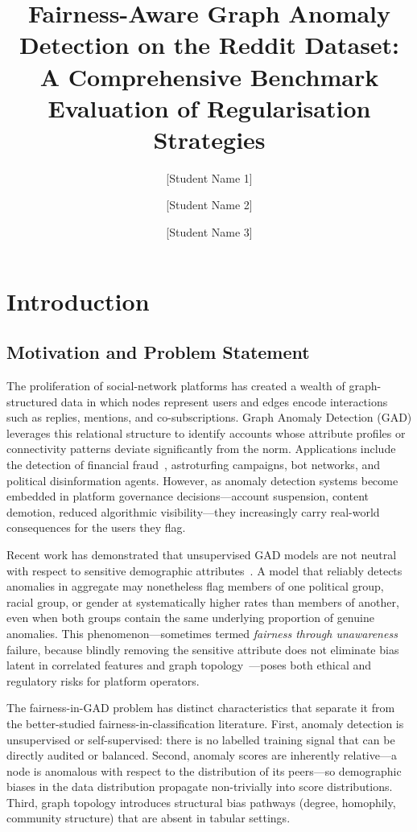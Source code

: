 \documentclass[sigconf,natbib=false]{acmart}
\title{Fairness-Aware Graph Anomaly Detection on the Reddit Dataset:\\
A Comprehensive Benchmark Evaluation of Regularisation Strategies}
\author{[Student Name 1]}
\affiliation{\institution{[University Name]}}
\author{[Student Name 2]}
\affiliation{\institution{[University Name]}}
\author{[Student Name 3]}
\affiliation{\institution{[University Name]}}
\begin{document}
\maketitle

\section{Introduction}

\subsection{Motivation and Problem Statement}

The proliferation of social-network platforms has created a wealth of graph-structured data in which nodes represent users and edges encode interactions such as replies, mentions, and co-subscriptions. Graph Anomaly Detection (GAD) leverages this relational structure to identify accounts whose attribute profiles or connectivity patterns deviate significantly from the norm. Applications include the detection of financial fraud~\cite{dou2020fraud}, astroturfing campaigns, bot networks, and political disinformation agents. However, as anomaly detection systems become embedded in platform governance decisions—account suspension, content demotion, reduced algorithmic visibility—they increasingly carry real-world consequences for the users they flag.

Recent work has demonstrated that unsupervised GAD models are not neutral with respect to sensitive demographic attributes~\cite{neoFairGraphAnomaly2024a,shekhar2021fairod}. A model that reliably detects anomalies in aggregate may nonetheless flag members of one political group, racial group, or gender at systematically higher rates than members of another, even when both groups contain the same underlying proportion of genuine anomalies. This phenomenon—sometimes termed \textit{fairness through unawareness} failure, because blindly removing the sensitive attribute does not eliminate bias latent in correlated features and graph topology~\cite{mehrabi2021survey}—poses both ethical and regulatory risks for platform operators.

The fairness-in-GAD problem has distinct characteristics that separate it from the better-studied fairness-in-classification literature. First, anomaly detection is unsupervised or self-supervised: there is no labelled training signal that can be directly audited or balanced. Second, anomaly scores are inherently relative—a node is anomalous with respect to the distribution of its peers—so demographic biases in the data distribution propagate non-trivially into score distributions. Third, graph topology introduces structural bias pathways (degree, homophily, community structure) that are absent in tabular settings.
\end{document}
